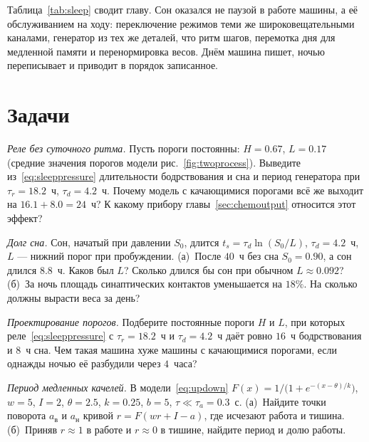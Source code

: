 Таблица~\ref{tab:sleep} сводит главу. Сон оказался не паузой в работе машины, а её обслуживанием на ходу: переключение режимов теми же широковещательными каналами, генератор из тех же деталей, что ритм шагов, перемотка дня для медленной памяти и перенормировка весов. Днём машина пишет, ночью переписывает и приводит в порядок записанное.

\section{Задачи}

\begin{exercise}[\lvlA]
\label{ex:20:1}
\emph{Реле без суточного ритма.} Пусть пороги постоянны: $H=0.67$, $L=0.17$ (средние значения порогов модели рис.~\ref{fig:twoprocess}). Выведите из~\eqref{eq:sleeppressure} длительности бодрствования и сна и период генератора при $\tau_r=18.2$~ч, $\tau_d=4.2$~ч. Почему модель с качающимися порогами всё же выходит на $16.1+8.0=24$~ч? К какому прибору главы~\ref{sec:chemoutput} относится этот эффект?
\end{exercise}

\begin{exercise}[\lvlA]
\label{ex:20:2}
\emph{Долг сна.} Сон, начатый при давлении $S_0$, длится $t_s=\tau_d\ln(S_0/L)$, $\tau_d=4.2$~ч, $L$ --- нижний порог при пробуждении. (а)~После $40$~ч без сна $S_0=0.90$, а сон длился $8.8$~ч. Каков был $L$? Сколько длился бы сон при обычном $L\approx0.092$? (б)~За ночь площадь синаптических контактов уменьшается на $18\%$. На сколько должны вырасти веса за день?
\end{exercise}

\begin{exercise}[\lvlB]
\label{ex:20:3}
\emph{Проектирование порогов.} Подберите постоянные пороги $H$ и $L$, при которых реле~\eqref{eq:sleeppressure} с $\tau_r=18.2$~ч и $\tau_d=4.2$~ч даёт ровно $16$~ч бодрствования и $8$~ч сна. Чем такая машина хуже машины с качающимися порогами, если однажды ночью её разбудили через $4$~часа?
\end{exercise}

\begin{exercise}[\lvlB]
\label{ex:20:4}
\emph{Период медленных качелей.} В модели~\eqref{eq:updown} $F(x)=1/\bigl(1+e^{-(x-\theta)/k}\bigr)$, $w=5$, $I=2$, $\theta=2.5$, $k=0.25$, $b=5$, $\tau\ll\tau_a=0.3$~с. (а)~Найдите точки поворота $a_{\text{в}}$ и $a_{\text{н}}$ кривой $r=F(wr+I-a)$, где исчезают работа и тишина. (б)~Приняв $r\approx1$ в работе и $r\approx0$ в тишине, найдите период и долю работы.
\end{exercise}

